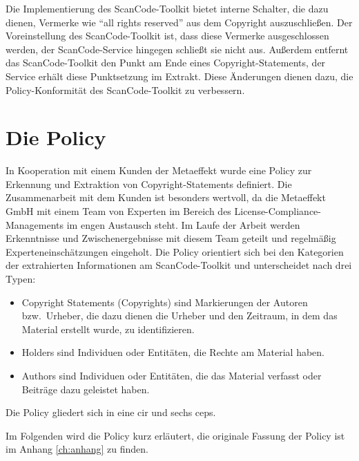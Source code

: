 Die Implementierung des ScanCode-Toolkit bietet interne Schalter, die dazu dienen, Vermerke wie \enquote{all rights reserved} aus dem Copyright auszuschließen.
Der Voreinstellung des ScanCode-Toolkit ist, dass diese Vermerke ausgeschlossen werden, der ScanCode-Service hingegen schließt sie nicht aus.
Außerdem entfernt das ScanCode-Toolkit den Punkt am Ende eines Copyright-Statements, der Service erhält diese Punktsetzung im Extrakt.
Diese Änderungen dienen dazu, die Policy-Konformität des ScanCode-Toolkit zu verbessern\autocite{noauthor_metaeffekt-scancode-service_2025}.


\section{Die Policy}\label{sec:policy}

In Kooperation mit einem Kunden der Metaeffekt wurde eine Policy zur Erkennung und Extraktion von Copyright-Statements definiert.
Die Zusammenarbeit mit dem Kunden ist besonders wertvoll, da die Metaeffekt GmbH mit einem Team von Experten im Bereich des License-Compliance-Managements im engen Austausch steht.
Im Laufe der Arbeit werden Erkenntnisse und Zwischenergebnisse mit diesem Team geteilt und regelmäßig Experteneinschätzungen eingeholt.
Die Policy orientiert sich bei den Kategorien der extrahierten Informationen am ScanCode-Toolkit und unterscheidet nach drei Typen:
\begin{itemize}
    \item Copyright Statements (Copyrights) sind Markierungen der Autoren bzw.\ Urheber, die dazu dienen die Urheber und den Zeitraum, in dem das Material erstellt wurde, zu identifizieren.
    \item Holders sind Individuen oder Entitäten, die Rechte am Material haben.
    \item Authors sind Individuen oder Entitäten, die das Material verfasst oder Beiträge dazu geleistet haben.
\end{itemize}

Die Policy gliedert sich in eine \gls{cir} und sechs \glspl{cep}.

Im Folgenden wird die Policy kurz erläutert, die originale Fassung der Policy ist im Anhang \ref{ch:anhang} zu finden.

